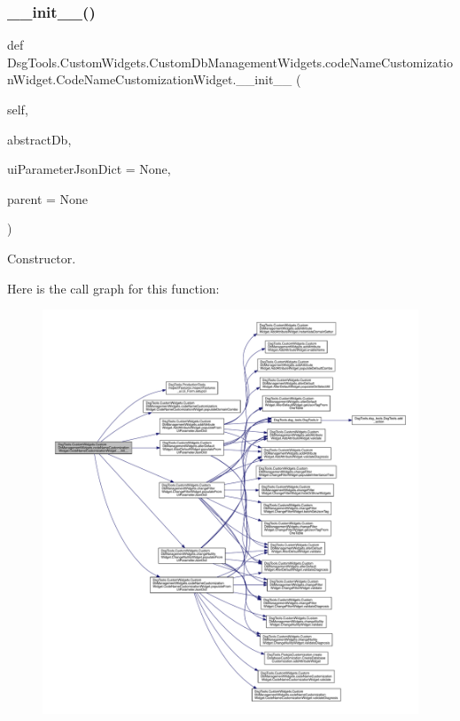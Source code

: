 \subsubsection{\texorpdfstring{\+\_\+\+\_\+init\+\_\+\+\_\+()}{\_\_init\_\_()}}
{\footnotesize\ttfamily def Dsg\+Tools.\+Custom\+Widgets.\+Custom\+Db\+Management\+Widgets.\+code\+Name\+Customization\+Widget.\+Code\+Name\+Customization\+Widget.\+\_\+\+\_\+init\+\_\+\+\_\+ (\begin{DoxyParamCaption}\item[{}]{self,  }\item[{}]{abstract\+Db,  }\item[{}]{ui\+Parameter\+Json\+Dict = {\ttfamily None},  }\item[{}]{parent = {\ttfamily None} }\end{DoxyParamCaption})}

\begin{DoxyVerb}Constructor.\end{DoxyVerb}
 Here is the call graph for this function\+:
\nopagebreak
\begin{figure}[H]
\begin{center}
\leavevmode
\includegraphics[width=350pt]{class_dsg_tools_1_1_custom_widgets_1_1_custom_db_management_widgets_1_1code_name_customization_wf164086e8f1ece2de77d7ffd06fc1ae2_a3abf03136b9ec5543135a9e482addd55_cgraph}
\end{center}
\end{figure}


